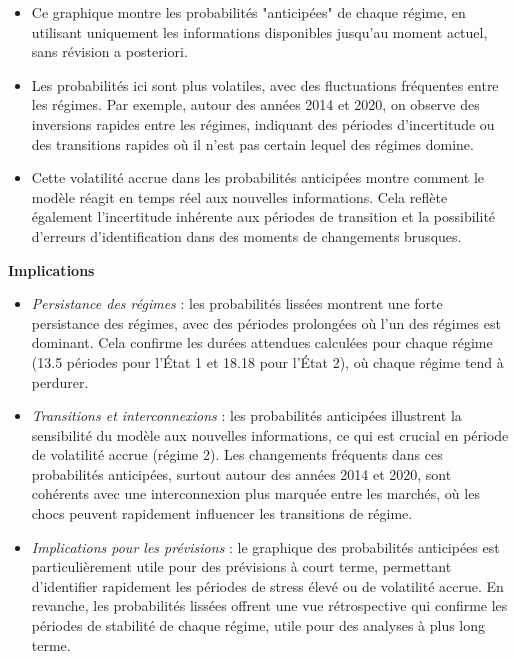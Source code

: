 \begin{itemize}
    \item Ce graphique montre les probabilités "anticipées" de chaque régime, en utilisant uniquement les informations disponibles jusqu’au moment actuel, sans révision a posteriori.
    \item Les probabilités ici sont plus volatiles, avec des fluctuations fréquentes entre les régimes. Par exemple, autour des années 2014 et 2020, on observe des inversions rapides entre les régimes, indiquant des périodes d’incertitude ou des transitions rapides où il n'est pas certain lequel des régimes domine.
    \item Cette volatilité accrue dans les probabilités anticipées montre comment le modèle réagit en temps réel aux nouvelles informations. Cela reflète également l'incertitude inhérente aux périodes de transition et la possibilité d'erreurs d'identification dans des moments de changements brusques.
\end{itemize}

\textbf{Implications}

\begin{itemize}
    \item \textit{Persistance des régimes} : les probabilités lissées montrent une forte persistance des régimes, avec des périodes prolongées où l'un des régimes est dominant. Cela confirme les durées attendues calculées pour chaque régime (13.5 périodes pour l'État 1 et 18.18 pour l'État 2), où chaque régime tend à perdurer.
    \item \textit{Transitions et interconnexions} : les probabilités anticipées illustrent la sensibilité du modèle aux nouvelles informations, ce qui est crucial en période de volatilité accrue (régime 2). Les changements fréquents dans ces probabilités anticipées, surtout autour des années 2014 et 2020, sont cohérents avec une interconnexion plus marquée entre les marchés, où les chocs peuvent rapidement influencer les transitions de régime.
    \item \textit{Implications pour les prévisions} : le graphique des probabilités anticipées est particulièrement utile pour des prévisions à court terme, permettant d’identifier rapidement les périodes de stress élevé ou de volatilité accrue. En revanche, les probabilités lissées offrent une vue rétrospective qui confirme les périodes de stabilité de chaque régime, utile pour des analyses à plus long terme.

\end{itemize}

